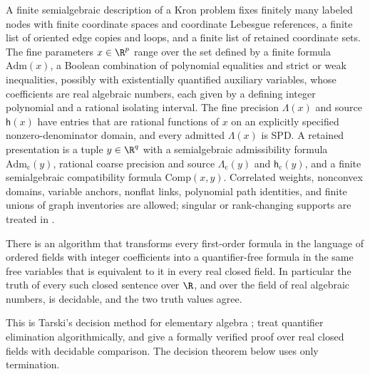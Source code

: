 A finite semialgebraic description of a Kron problem fixes finitely many
labeled nodes with finite coordinate spaces and coordinate Lebesgue
references, a finite list of oriented edge copies and loops, and a finite list
of retained coordinate sets. The fine parameters \(x\in\R^p\) range over the set
defined by a finite formula \(\mathrm{Adm}(x)\), a Boolean combination of
polynomial equalities and strict or weak inequalities, possibly with
existentially quantified auxiliary variables, whose coefficients are real
algebraic numbers, each given by a defining integer polynomial and a rational
isolating interval. The fine precision \(\Lambda(x)\) and source
\(\mathsf h(x)\) have entries that are rational functions of \(x\) on an
explicitly specified nonzero-denominator domain, and every admitted
\(\Lambda(x)\) is SPD. A retained presentation is a tuple \(y\in\R^q\) with a
semialgebraic admissibility formula \(\mathrm{Adm}_{\mathrm c}(y)\), rational
coarse precision and source \(\Lambda_{\mathrm c}(y)\) and
\(\mathsf h_{\mathrm c}(y)\), and a finite semialgebraic compatibility formula
\(\mathrm{Comp}(x,y)\). Correlated weights, nonconvex domains, variable anchors,
nonflat links, polynomial path identities, and finite unions of graph
inventories are allowed; singular or rank-changing supports are treated in
.

There is an algorithm that transforms every first-order formula in the language
of ordered fields with integer coefficients into a quantifier-free formula in
the same free variables that is equivalent to it in every real closed field. In
particular the truth of every such closed sentence over \(\R\), and over the
field of real algebraic numbers, is decidable, and the two truth values agree.

This is Tarski's decision method for elementary algebra \citep{Tarski1951};
\citet[pp.~533--562]{BasuPollackRoy2006} treat quantifier elimination
algorithmically, and \citet[Sec.~6]{CohenMahboubi2012LMCS} give a formally
verified proof over real closed fields with decidable comparison. The decision
theorem below uses only termination.

